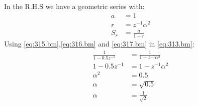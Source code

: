 \documentclass[journal,12pt,twocolumn]{IEEEtran}
\theoremstyle{remark}
\begin{document}
In the R.H.S we have a geometric series with:
\begin{align}
    a&=1\label{eq:315.bm}\\
    r&=z^{-1}\alpha^{2}\label{eq:316.bm}\\
    S_r&=\frac{a}{1-r}\label{eq:317.bm}
\end{align}
Using \eqref{eq:315.bm},\eqref{eq:316.bm} and \eqref{eq:317.bm} in \eqref{eq:313.bm}:
\begin{align}
\frac{1}{1-0.5z^{-1}}&=\frac{1}{1-z^{-1}\alpha^{2}}\label{eq:318.bm}\\
1-0.5z^{-1}&=1-z^{-1}\alpha^{2}\label{eq:319.bm}\\
\alpha^{2}&=0.5\label{eq:320.bm}\\
\alpha&=\sqrt{0.5}\label{eq:321.bm}\\
\alpha&=\frac{1}{\sqrt{2}}\label{eq:322.bm}
\end{align}
\end{document}
